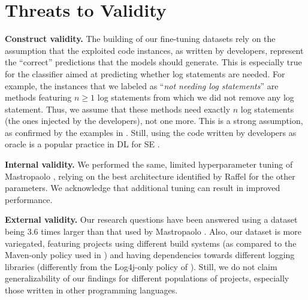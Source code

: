 \section{Threats to Validity} \label{sec:threats}

\textbf{Construct validity.} The building of our fine-tuning datasets rely on the assumption that the exploited code instances, as written by developers, represent the ``correct'' predictions that the models should generate. This is especially true for the classifier aimed at predicting whether log statements are needed. For example, the instances that we labeled as ``\emph{not needing log statements}'' are methods featuring $n \geq 1$ log statements from which we did not remove any log statement. Thus, we assume that these methods need exactly $n$ log statements (\ie the ones injected by the developers), not one more. This is a strong assumption, as confirmed by the examples in . Still, using the code written by developers as oracle is a popular practice in DL for SE \cite{tufano2022using, Tufano:tosem2019, tufano-mutants, watson2020learning, tufano2022generating}.


\textbf{Internal validity.}  We performed the same, limited hyperparameter tuning of Mastropaolo \etal \cite{mastropaolo2021studying}, relying on the best architecture identified by Raffel \etal \cite{raffel2019exploring} for the other parameters. We acknowledge that additional tuning can result in improved performance.


\textbf{External validity.} Our research questions have been answered using a dataset being 3.6 times larger than that used by Mastropaolo \etal \cite{mastropaolo2021studying}. Also, our dataset is more variegated, featuring projects using different build systems (as compared to the Maven-only policy used in \cite{mastropaolo2021studying}) and having dependencies towards different logging libraries (differently from the Log4j-only policy of \cite{mastropaolo2021studying}). Still, we do not claim generalizability of our findings for different populations of projects, especially those written in other programming languages.